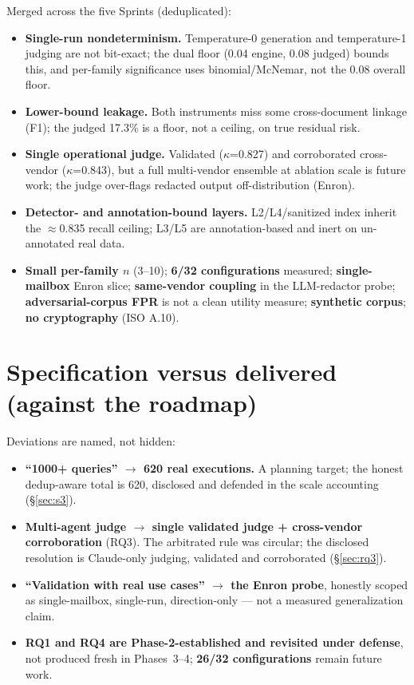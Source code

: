 \documentclass[11pt,a4paper]{article}
\newcommand{\kp}{\ensuremath{\kappa}}
\begin{document}
Merged across the five Sprints (deduplicated):
\begin{itemize}[leftmargin=1.4em,itemsep=1pt]
\item \textbf{Single-run nondeterminism.} Temperature-0 generation and temperature-1 judging are not
bit-exact; the dual floor (0.04 engine, 0.08 judged) bounds this, and per-family significance uses
binomial/McNemar, not the 0.08 overall floor.
\item \textbf{Lower-bound leakage.} Both instruments miss some cross-document linkage (F1); the judged
17.3\% is a floor, not a ceiling, on true residual risk.
\item \textbf{Single operational judge.} Validated (\kp{}=0.827) and corroborated cross-vendor
(\kp{}=0.843), but a full multi-vendor ensemble at ablation scale is future work; the judge over-flags
redacted output off-distribution (Enron).
\item \textbf{Detector- and annotation-bound layers.} L2/L4/sanitized index inherit the $\approx$0.835
recall ceiling; L3/L5 are annotation-based and inert on un-annotated real data.
\item \textbf{Small per-family $n$} (3--10); \textbf{6/32 configurations} measured; \textbf{single-mailbox}
Enron slice; \textbf{same-vendor coupling} in the LLM-redactor probe; \textbf{adversarial-corpus FPR} is
not a clean utility measure; \textbf{synthetic corpus}; \textbf{no cryptography} (ISO A.10).
\end{itemize}

\section{Specification versus delivered (against the roadmap)}

Deviations are named, not hidden:
\begin{itemize}[leftmargin=1.4em,itemsep=1pt]
\item \textbf{``1000+ queries'' $\to$ 620 real executions.} A planning target; the honest dedup-aware
total is 620, disclosed and defended in the scale accounting (\S\ref{sec:s3}).
\item \textbf{Multi-agent judge $\to$ single validated judge + cross-vendor corroboration} (RQ3). The
arbitrated rule was circular; the disclosed resolution is Claude-only judging, validated and
corroborated (\S\ref{sec:rq3}).
\item \textbf{``Validation with real use cases'' $\to$ the Enron probe}, honestly scoped as
single-mailbox, single-run, direction-only --- not a measured generalization claim.
\item \textbf{RQ1 and RQ4 are Phase-2-established and revisited under defense}, not produced fresh in
Phases~3--4; \textbf{26/32 configurations} remain future work.
\end{itemize}
\end{document}
